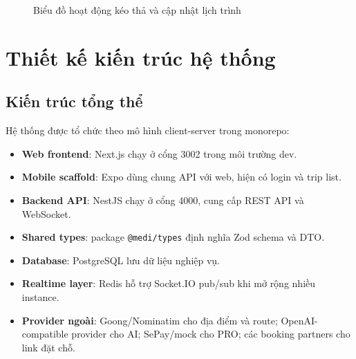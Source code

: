\documentclass[a4paper]{report}
\begin{document}
\begin{figure}[H]
\centering
{}
\caption{Biểu đồ hoạt động kéo thả và cập nhật lịch trình}
\label{fig:activity-reorder}
\end{figure}

\section{Thiết kế kiến trúc hệ thống}

\subsection{Kiến trúc tổng thể}

Hệ thống được tổ chức theo mô hình client-server trong monorepo:

\begin{itemize}
  \item \textbf{Web frontend}: Next.js chạy ở cổng 3002 trong môi trường dev.
  \item \textbf{Mobile scaffold}: Expo dùng chung API với web, hiện có login và trip list.
  \item \textbf{Backend API}: NestJS chạy ở cổng 4000, cung cấp REST API và WebSocket.
  \item \textbf{Shared types}: package \texttt{@medi/types} định nghĩa Zod schema và DTO.
  \item \textbf{Database}: PostgreSQL lưu dữ liệu nghiệp vụ.
  \item \textbf{Realtime layer}: Redis hỗ trợ Socket.IO pub/sub khi mở rộng nhiều instance.
  \item \textbf{Provider ngoài}: Goong/Nominatim cho địa điểm và route; OpenAI-compatible provider cho AI; SePay/mock cho PRO; các booking partners cho link đặt chỗ.
\end{itemize}
\end{document}
